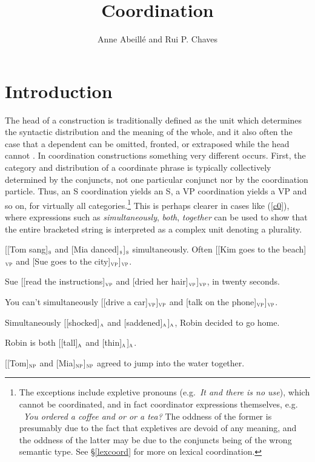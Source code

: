 \documentclass[output=paper]{langsci/langscibook}
\title{Coordination}
\author{Anne Abeill\'{e}\affiliation{Paris VII} and Rui P. Chaves\affiliation{Buffalo}}
\newcommand{\subl}[1]{$_{\small \textsc{#1}}$}
\begin{document}
\label{chap-coordination}



\section{Introduction} 


The head of a construction is traditionally defined as the unit which determines the syntactic distribution and the meaning of the whole, and it also often the case that a dependent can be omitted, fronted, or extraposed while the head cannot \citep{zwicky85}.
In coordination constructions something very different occurs. First, the category and distribution of
a coordinate phrase is typically collectively
determined by the conjuncts, not one particular conjunct
nor by the coordination particle.
Thus, an S coordination yields an S, a VP coordination yields a VP and so on, for virtually all categories.\footnote{The exceptions include
expletive pronouns (e.g.\ {\it *It and there is no use}), which cannot be coordinated, and in fact coordinator expressions themselves, e.g. \ {\it *You ordered a coffee and or or a tea?} The oddness of the former is presumably due to the fact that expletives are devoid of any meaning, and the oddness of the latter may be due to the conjuncts being of the wrong semantic type. See \S\ref{lexcoord} for more on lexical coordination.}
This is perhaps clearer in cases like (\ref{c0}), where
expressions such as {\it simultaneously}, {\it both}, 
{\it together} can be used to show that the entire bracketed string
is interpreted as a complex unit denoting a plurality.


\begin{exe}
\ex
\begin{xlista}
\ex{} [[Tom sang]\subl{s} and [Mia danced]\subl{s}]\subl{s} simultaneously.
\ex{} Often [[Kim goes to the beach]\subl{vp} and [Sue goes to the city]\subl{vp}]\subl{vp}.

\ex{} Sue [[read the instructions]\subl{vp} and [dried her hair]\subl{vp}]\subl{vp}, in twenty seconds.

\ex{} You can't simultaneously [[drive a car]\subl{vp}]\subl{vp} and [talk on the phone]\subl{vp}]\subl{vp}.

\ex{} Simultaneously [[shocked]\subl{a} and [saddened]\subl{a}]\subl{a}, Robin decided to go home.

\ex Robin is both [[tall]\subl{a} and [thin]\subl{a}]\subl{a}.

\ex{} [[Tom]\subl{np} and [Mia]\subl{np}]\subl{np} agreed to jump into the water together.

\end{xlista}\label{c0}
\end{exe}
\end{document}
